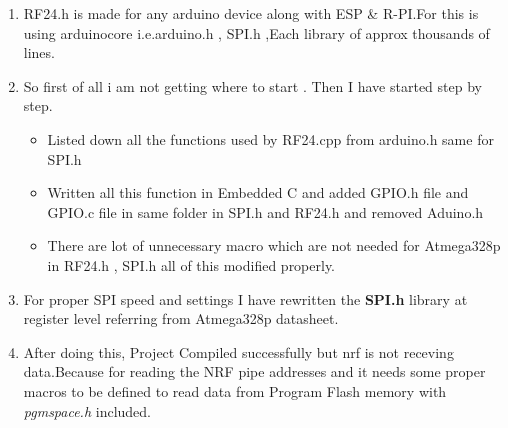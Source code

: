 \documentclass[a4paper,12pt,oneside]{book}
\begin{document}
\begin{itemize}
         \begin{enumerate}
         \item RF24.h is made for any arduino device along with ESP \& R-PI.For this is using arduinocore i.e.arduino.h , SPI.h ,Each library of  approx thousands of lines.
         \item So first of all i am not getting where to start . Then I have started step by step.\begin{itemize}
         \item Listed down all the functions used by RF24.cpp from arduino.h same for SPI.h
         \item Written all this function in Embedded C and added GPIO.h file and GPIO.c file in same folder in SPI.h and RF24.h and removed Aduino.h
         \item There are lot of unnecessary macro which are not needed for Atmega328p in RF24.h , SPI.h  all of this modified properly.
         \end{itemize}
         \item For proper SPI speed and settings I have rewritten the \textbf{SPI.h} library at register level referring from Atmega328p datasheet.
         \item After doing this, Project Compiled successfully but nrf is not receving data.Because for reading the NRF pipe addresses and it needs some proper macros to be defined to read data from Program Flash memory with \textit{pgmspace.h} included.
         \end{enumerate}
   

\end{itemize}
\end{document}
